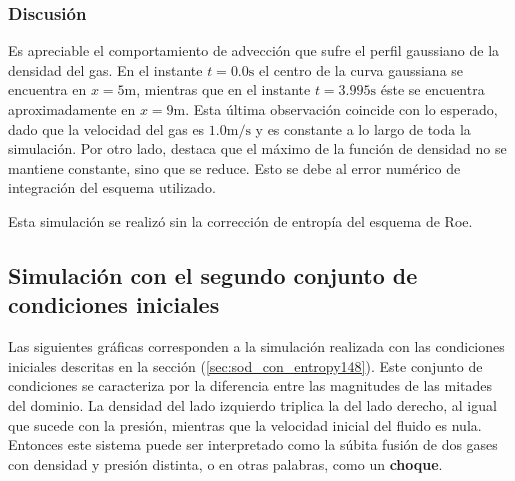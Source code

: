 \subsubsection{Discusión}
Es apreciable el comportamiento de advección que sufre el perfil gaussiano de la densidad del gas. En el instante $t=0.0\unit{\s}$ el centro de la curva gaussiana se encuentra en $x=5\unit{\meter}$, mientras que en el instante $t=3.995\unit{\s}$ éste se encuentra aproximadamente en $x=9\unit{\meter}$. Esta última observación coincide con lo esperado, dado que la velocidad del gas es $1.0\unit{\meter\per\s}$ y es constante a lo largo de toda la simulación.
Por otro lado, destaca que el máximo de la función de densidad no se mantiene constante, sino que se reduce. Esto se debe al error numérico de integración del esquema utilizado.

Esta simulación se realizó sin la corrección de entropía del esquema de Roe.
\subsection{Simulación con el segundo conjunto de condiciones iniciales}
Las siguientes gráficas corresponden a la simulación realizada con las condiciones iniciales descritas en la sección (\ref{sec:sod_con_entropy148}). Este conjunto de condiciones se caracteriza por la diferencia entre las magnitudes de las mitades del dominio. La densidad del lado izquierdo triplica la del lado derecho, al igual que sucede con la presión, mientras que la velocidad inicial del fluido es nula. Entonces este sistema puede ser interpretado como la súbita fusión de dos gases con densidad y presión distinta, o en otras palabras, como un \textbf{choque}.
